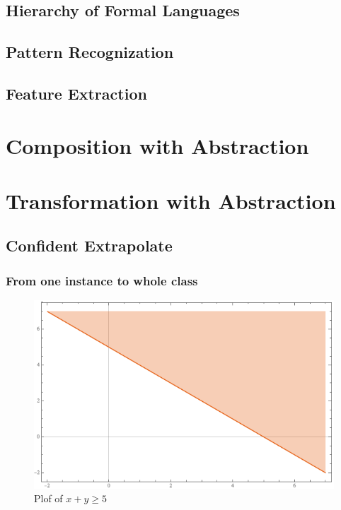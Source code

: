 \subsection{Hierarchy of Formal Languages}
\subsection{Pattern Recognization}
\subsection{Feature Extraction}

\section{Composition with Abstraction}

\section{Transformation with Abstraction}
\subsection{Confident Extrapolate}
\subsubsection*{From one instance to whole class}

\begin{figure}
  \includegraphics[width=\linewidth]{img/5-x.png}
  \caption{Plof of $ x + y \geqslant 5$}
  \label{fig:5-x}
\end{figure}

